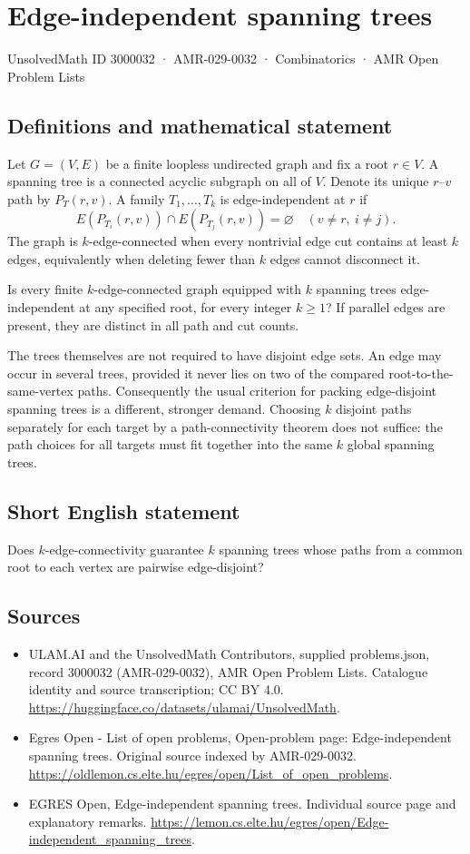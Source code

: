 \documentclass[11pt,a4paper]{article}
\begin{document}
\section*{Edge-independent spanning trees}\label{3000032}
{\small UnsolvedMath ID 3000032 · AMR-029-0032 · Combinatorics · AMR Open Problem Lists}
\subsection{Definitions and mathematical statement}
Let $G=(V,E)$ be a finite loopless undirected graph and fix a root
$r\in V$. A spanning tree is a connected acyclic subgraph on all of
$V$. Denote its unique $r$--$v$ path by $P_T(r,v)$.
A family $T_1,\ldots,T_k$ is edge-independent at $r$ if
\[
 E(P_{T_i}(r,v))\cap E(P_{T_j}(r,v))=\varnothing
                 \quad(v\ne r,\ i\ne j).
\]
The graph is $k$-edge-connected when every nontrivial edge cut contains
at least $k$ edges, equivalently when deleting fewer than $k$ edges
cannot disconnect it.

Is every finite $k$-edge-connected graph equipped with $k$ spanning
trees edge-independent at any specified root, for every integer $k\ge1$?
If parallel edges are present, they are distinct in all path and cut
counts.

The trees themselves are not required to have disjoint edge sets.
An edge may occur in several trees, provided it never lies on two
of the compared root-to-the-same-vertex paths. Consequently the usual
criterion for packing edge-disjoint spanning trees is a different,
stronger demand. Choosing $k$ disjoint paths separately for each target
by a path-connectivity theorem does not suffice: the path choices for
all targets must fit together into the same $k$ global spanning trees.
\subsection{Short English statement}
Does $k$-edge-connectivity guarantee $k$ spanning trees whose
paths from a common root to each vertex are pairwise edge-disjoint?
\subsection{Sources}
\begin{itemize}
\item[S1] ULAM.AI and the UnsolvedMath Contributors, supplied problems.json, record 3000032 (AMR-029-0032), AMR Open Problem Lists. Catalogue identity and source transcription; CC BY 4.0.
\url{https://huggingface.co/datasets/ulamai/UnsolvedMath}.
\item[S2] Egres Open - List of open problems, Open-problem page: Edge-independent spanning trees. Original source indexed by AMR-029-0032.
\url{https://oldlemon.cs.elte.hu/egres/open/List_of_open_problems}.
\item[S3] EGRES Open, Edge-independent spanning trees. Individual source page and explanatory remarks.
\url{https://lemon.cs.elte.hu/egres/open/Edge-independent_spanning_trees}.
\end{itemize}
\end{document}

